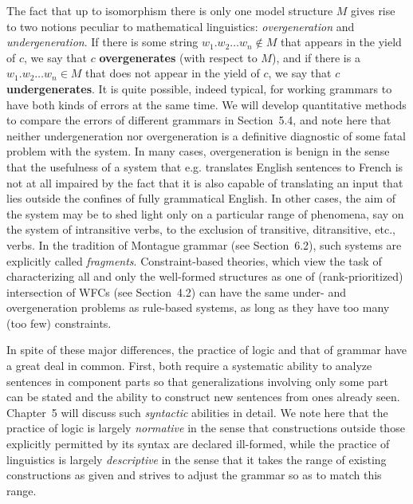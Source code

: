 The fact that up to isomorphism there is only one model structure $M$ gives
rise to two notions peculiar to mathematical linguistics: {\it overgeneration}
and {\it undergeneration}. If there is some string $w_1 . w_2 \ldots w_n
\not\in M$ that appears in the yield of $c$, we say that $c$ {\bf
overgenerates} (with respect to $M$), and if there is a $w_1 . w_2  \ldots
w_n \in M$ that does not appear in the yield of $c$, we say that $c$ {\bf
undergenerates}. It is quite possible, indeed typical, for working grammars to
have both kinds of errors at the same time. We will develop quantitative
methods to compare the errors of different grammars in Section~5.4, and note
here that neither undergeneration nor overgeneration is a definitive
diagnostic of some fatal problem with the system. In many cases,
overgeneration is benign in the sense that the usefulness of a system that
e.g. translates English sentences to French is not at all impaired by the fact
that it is also capable of translating an input that lies outside the confines
of fully grammatical English. In other cases, the aim of the system may be to
shed light only on a particular range of phenomena, say on the system of
intransitive verbs, to the exclusion of transitive, ditransitive, etc., verbs.
In the tradition of Montague grammar (see Section~6.2), such systems are
explicitly called {\it fragments}. Constraint-based theories, which view 
the task of characterizing all and only the well-formed structures as one 
of (rank-prioritized) intersection of WFCs (see Section~4.2) can have the same 
under- and overgeneration problems as rule-based systems, as long as they 
have too many (too few) constraints. 

In spite of these major differences, the practice of logic and that of grammar
have a great deal in common. First, both require a systematic ability to
analyze sentences in component parts so that generalizations involving only
some part can be stated and the ability to construct new sentences from ones
already seen. Chapter~5 will discuss such {\it syntactic} abilities in
detail. We note here that the practice of logic is largely {\it normative} in
the sense that constructions outside those explicitly permitted by its syntax
are declared ill-formed, while the practice of linguistics is largely {\it
  descriptive} in the sense that it takes the range of existing constructions
as given and strives to adjust the grammar so as to match this range.
 

